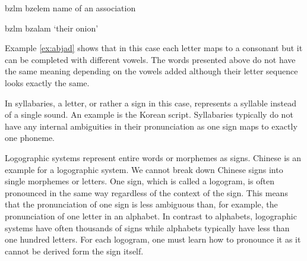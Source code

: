 \begin{description}
\begin{covsubexamples}[preamble={Hebrew examples that are first mapped to Latin alphabet then to the Latin alphabet including vowels and in the end the English translation.}]
\label{ex:abjad}
\item {} \>\> bzlm \>\> bzelem \>\> name of an association
\item {} \>\> bzlm \>\> bzalam \>\> `their onion'
\end{covsubexamples}

Example \ref{ex:abjad} shows that in this case each letter maps to a consonant but it can be completed with different vowels. The words presented above do not have the same meaning depending on the vowels added although their letter sequence looks exactly the same. 

\item[\textsc{Syllabary}] In syllabaries, a letter, or rather a sign in this case, represents a syllable instead of a single sound. An example is the Korean script. Syllabaries typically do not have any internal ambiguities in their pronunciation as one sign maps to exactly one phoneme.   

\item[\textsc{Logographic systems}] Logographic systems represent entire words or morphemes as signs. Chinese is an example for a logographic system. We cannot break down Chinese signs into single morphemes or letters. One sign, which is called a logogram, is often pronounced in the same way regardless of the context of the sign. This means that the pronunciation of one sign is less ambiguous than, for example, the pronunciation of one letter in an alphabet. In contrast to alphabets, logographic systems have often thousands of signs while alphabets typically have less than one hundred letters. For each logogram, one must learn how to pronounce it as it cannot be derived form the sign itself.
\end{description}


